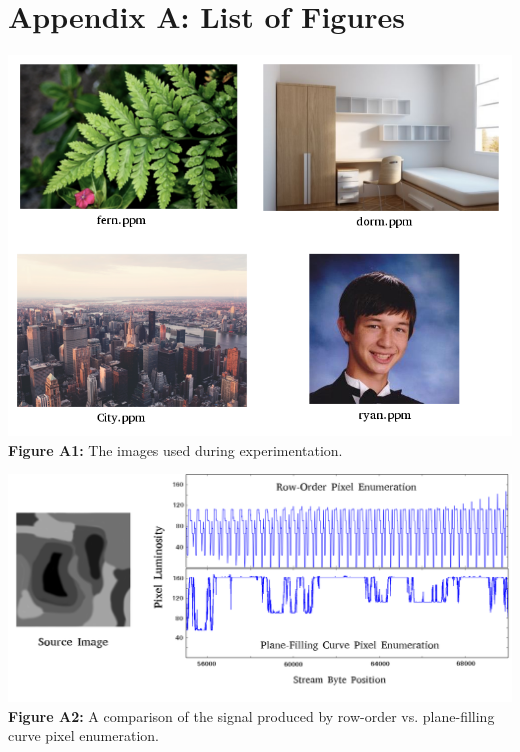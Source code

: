 \documentclass[twoside]{article}
\begin{document}
\section*{Appendix A: \:\: List of Figures}

\vspace{1em}
\begin{center}
\includegraphics[scale=0.5]{images}\\
\textbf{Figure A1: } The images used during experimentation.\\ 
\end{center}

\vspace{1em}
\begin{center}
\includegraphics[scale=0.24]{srf_signal}\\
\textbf{Figure A2: } A comparison of the signal produced by row-order vs. plane-filling curve pixel enumeration.\\ 
\end{center}
\end{document}
